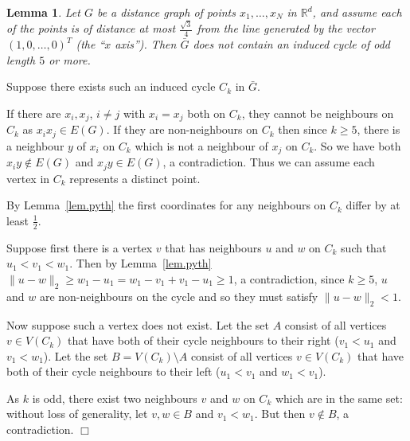 \documentclass{article}
\newenvironment{proof}{\noindent{\bf Proof}}{\hspace*{\fill}$\Box$}
\newtheorem{lemma} [theorem] {Lemma}\newtheorem{attempt} [theorem] {Attempt}\newtheorem{corollary} [theorem] {Corollary}\newtheorem{prop} [theorem] {Proposition}\newtheorem{definition} [theorem] {Definition}\newtheorem{remark} [theorem] {Remark}\newtheorem{conjecture} [theorem] {Conjecture}\newtheorem{claim} [theorem] {Claim}
\begin{document}
\begin{lemma}\label{lem.C5_complement}
    Let $G$ be a distance graph of points $x_1, \dots, x_N$ in $\mathbb{R}^d$,
    and assume each of the points is of distance at most $\frac {\sqrt 3} 4$
    from the line generated by the vector $(1, 0, \dots,0)^T$ (the ``$x$ axis''). 
    Then $\bar{G}$ does not contain
    an induced cycle of odd length $5$ or more.
\end{lemma}
\begin{proof}
    Suppose there exists such an induced cycle $C_k$ in $\bar{G}$.

    If there are $x_i, x_j$, $i \ne j$ with $x_i=x_j$ both on $C_k$,
    they cannot be neighbours on $C_k$ as $x_ix_j \in E(G)$.
    If they are non-neighbours on $C_k$ then since $k\ge 5$, there is a 
    neighbour $y$ of $x_i$ on $C_k$ which is not a neighbour of $x_j$ on $C_k$.
    So we have both $x_i y \not \in E(G)$ and  $x_j y \in E(G)$, a contradiction. 
    Thus we can assume each vertex in $C_k$ represents a distinct point.

    By Lemma~\ref{lem.pyth} the first coordinates
    for any neighbours on $C_k$ differ by at least $\frac 1 2$.

    Suppose first there is a vertex $v$ that has neighbours $u$ and $w$ on $C_k$
    such that $u_1 < v_1 < w_1$. Then by Lemma~\ref{lem.pyth} $\|u-w\|_2 \ge w_1 - u_1 = w_1 - v_1 + v_1 - u_1 \ge 1$,
    a contradiction, since $k \ge 5$,  $u$ and $w$ are non-neighbours on the cycle and so they must
    satisfy $\|u-w\|_2 < 1$.

    Now suppose such a vertex does not exist. Let the set $A$ consist
    of all vertices $v \in V(C_k)$ that have both of their cycle neighbours to their right ($v_1 < u_1$ and $v_1 < w_1$). 
    Let the set $B = V(C_k) \setminus A$ consist of
    all vertices $v\in V(C_k)$ that have both of their cycle neighbours to their left ($u_1 < v_1$ and $w_1 < v_1$).
    
As $k$ is odd, there exist two neighbours $v$ and $w$ on $C_k$ which
    are in the same set: without loss of generality, let $v, w \in B$ and $v_1 < w_1$.
    But then $v \not \in B$, a contradiction.
\end{proof}
\end{document}

